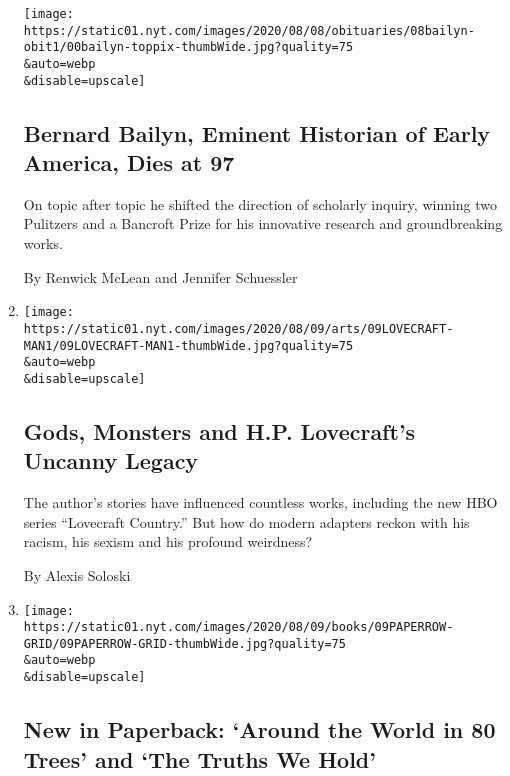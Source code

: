 \begin{enumerate}
  \texttt{[image: https://static01.nyt.com/images/2020/08/08/obituaries/08bailyn-obit1/00bailyn-toppix-thumbWide.jpg?quality=75\\\&auto=webp\\\&disable=upscale]}

  \hypertarget{bernard-bailyn-eminent-historian-of-early-america-dies-at-97}{%
  \subsection{Bernard Bailyn, Eminent Historian of Early America, Dies
  at
  97}\label{bernard-bailyn-eminent-historian-of-early-america-dies-at-97}}

  On topic after topic he shifted the direction of scholarly inquiry,
  winning two Pulitzers and a Bancroft Prize for his innovative research
  and groundbreaking works.

  By Renwick McLean and Jennifer Schuessler
\item
  \href{/2020/08/07/arts/television/hp-lovecraft.html}{}

  \texttt{[image: https://static01.nyt.com/images/2020/08/09/arts/09LOVECRAFT-MAN1/09LOVECRAFT-MAN1-thumbWide.jpg?quality=75\\\&auto=webp\\\&disable=upscale]}

  \hypertarget{gods-monsters-and-hp-lovecrafts-uncanny-legacy}{%
  \subsection{Gods, Monsters and H.P. Lovecraft's Uncanny
  Legacy}\label{gods-monsters-and-hp-lovecrafts-uncanny-legacy}}

  The author's stories have influenced countless works, including the
  new HBO series ``Lovecraft Country.'' But how do modern adapters
  reckon with his racism, his sexism and his profound weirdness?

  By Alexis Soloski
\item
  \href{/2020/08/07/books/review/new-paperbacks.html}{}

  \texttt{[image: https://static01.nyt.com/images/2020/08/09/books/09PAPERROW-GRID/09PAPERROW-GRID-thumbWide.jpg?quality=75\\\&auto=webp\\\&disable=upscale]}

  \hypertarget{new-in-paperback-around-the-world-in-80-trees-and-the-truths-we-hold}{%
  \subsection{New in Paperback: `Around the World in 80 Trees' and `The
  Truths We
  Hold'}\label{new-in-paperback-around-the-world-in-80-trees-and-the-truths-we-hold}}


\end{enumerate}
